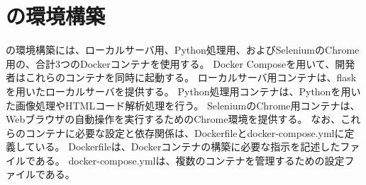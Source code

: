 \section{\toolName の環境構築}\label{sec:MixVRT_env_gen}
\toolName の環境構築には、ローカルサーバ用、Python処理用、およびSeleniumのChrome用の、合計3つのDockerコンテナ\cite{Docker Container}を使用する。
Docker Compose\cite{Docker Compose}を用いて、開発者はこれらのコンテナを同時に起動する。
ローカルサーバ用コンテナは、flaskを用いたローカルサーバを提供する。
Python処理用コンテナは、Pythonを用いた画像処理やHTMLコード解析処理を行う。
SeleniumのChrome用コンテナは、Webブラウザの自動操作を実行するためのChrome環境を提供する。
なお、これらのコンテナに必要な設定と依存関係は、Dockerfileとdocker-compose.ymlに定義している。
Dockerfileは、Dockerコンテナの構築に必要な指示を記述したファイルである。
docker-compose.ymlは、複数のコンテナを管理するための設定ファイルである。